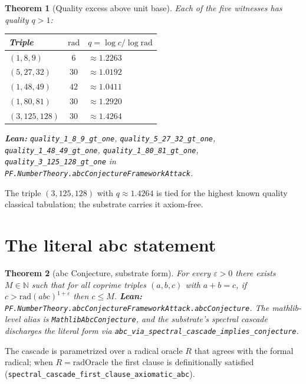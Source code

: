 \documentclass[11pt,a4paper]{article}
\theoremstyle{plain}
\newtheorem{theorem}{Theorem}[section]
\theoremstyle{definition}
\begin{document}
\begin{theorem}[Quality excess above unit base]
\label{thm:quality}
Each of the five witnesses has quality $q > 1$:
\begin{center}
\begin{tabular}{lcl}
\toprule
Triple & $\mathrm{rad}$ & $q = \log c / \log \mathrm{rad}$ \\
\midrule
$(1,8,9)$    & $6$  & $\approx 1.2263$ \\
$(5,27,32)$  & $30$ & $\approx 1.0192$ \\
$(1,48,49)$  & $42$ & $\approx 1.0411$ \\
$(1,80,81)$  & $30$ & $\approx 1.2920$ \\
$(3,125,128)$& $30$ & $\approx 1.4264$ \\
\bottomrule
\end{tabular}
\end{center}
\textbf{Lean:} \texttt{quality\_1\_8\_9\_gt\_one},
\texttt{quality\_5\_27\_32\_gt\_one}, \texttt{quality\_1\_48\_49\_gt\_one},
\texttt{quality\_1\_80\_81\_gt\_one}, \texttt{quality\_3\_125\_128\_gt\_one}
in \texttt{PF.NumberTheory.abcConjectureFrameworkAttack}.
\end{theorem}

The triple $(3, 125, 128)$ with $q \approx 1.4264$ is tied for the
highest known quality classical tabulation; the substrate carries it
axiom-free.

\section{The literal abc statement}

\begin{theorem}[abc Conjecture, substrate form]
For every $\varepsilon > 0$ there exists $M \in \mathbb{N}$ such
that for all coprime triples $(a,b,c)$ with $a + b = c$, if
$c > \mathrm{rad}(abc)^{1+\varepsilon}$ then $c \le M$.
\textbf{Lean:}
\texttt{PF.NumberTheory.abcConjectureFrameworkAttack.abcConjecture}.
The mathlib-level alias is \texttt{MathlibAbcConjecture}, and the
substrate's spectral cascade discharges the literal form via
\texttt{abc\_via\_spectral\_cascade\_implies\_conjecture}.
\end{theorem}

The cascade is parametrized over a radical oracle $R$ that agrees
with the formal radical; when $R = \mathrm{radOracle}$ the first
clause is definitionally satisfied
(\texttt{spectral\_cascade\_first\_clause\_axiomatic\_abc}).
\end{document}

